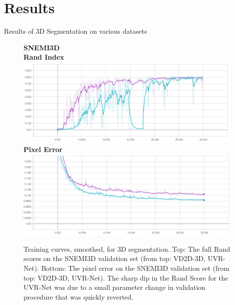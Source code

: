 \section{Results}


\begin{table}
	\centering
	\caption{Results of 3D Segmentation on various datasets}
	 

	 

	 

	 
	
	\label{tab:3d_results}
\end{table}

\begin{figure}
\centering
\textbf{SNEMI3D} \\
\textbf{Rand Index}
\includegraphics[width=\textwidth]{img/snemi_rand.png} \\
\textbf{Pixel Error}
\includegraphics[width=\textwidth]{img/snemi_px_err.png}

\caption[Training curves for 3D segmentation for SNEMI3D]{Training curves, smoothed, for 3D segmentation. Top: The full Rand scores on the SNEMI3D validation set (from top: VD2D-3D, UVR-Net). Bottom: The pixel error on the SNEMI3D validation set (from top: VD2D-3D, UVR-Net). The sharp dip in the Rand Score for the UVR-Net was due to a small parameter change in validation procedure that was quickly reverted.}
\label{fig:snemi_training_curves}

\end{figure}

